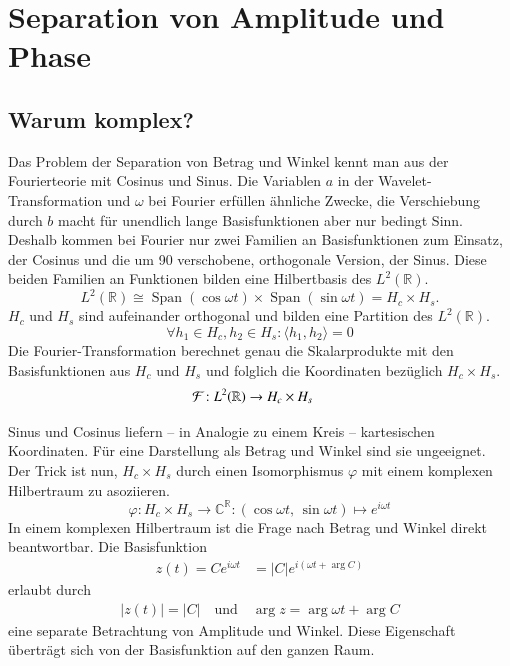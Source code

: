 \section{Separation von Amplitude und Phase}
\label{complex:separate}
\subsection{Warum komplex?}
Das Problem der Separation von Betrag und Winkel kennt man aus der Fourierteorie mit Cosinus und Sinus.
Die Variablen $a$ in der Wavelet-Transformation und $\omega$ bei Fourier erfüllen ähnliche Zwecke, die Verschiebung durch $b$ macht für unendlich lange Basisfunktionen aber nur bedingt Sinn.
Deshalb kommen bei Fourier nur zwei Familien an Basisfunktionen zum Einsatz, der Cosinus und die um 90\textdegree{} verschobene, orthogonale Version, der Sinus.
Diese beiden Familien an Funktionen bilden eine Hilbertbasis des $L^2(\mathbb{R})$. %
\[L^2(\mathbb{R}) \cong \mathop{\text{Span}}(\cos\omega t) \times \mathop{\text{Span}}(\sin\omega t) = H_c \times H_s.\]
$H_c$ und $H_s$ sind aufeinander orthogonal und bilden eine Partition des $L^2(\mathbb{R})$.
\[
\forall h_1 \in H_c, h_2 \in H_s: \langle h_1, h_2\rangle = 0
\]
Die Fourier-Transformation berechnet genau die Skalarprodukte mit den Basisfunktionen aus $H_c$ und $H_s$ und folglich die Koordinaten bezüglich $H_c\times H_s$.
\begin{align*}
	\Four : L^2(\mathbb{R}) &\to H_c \times H_s
\end{align*}

Sinus und Cosinus liefern -- in Analogie zu einem Kreis -- kartesischen Koordinaten. 
Für eine Darstellung als Betrag und Winkel sind sie ungeeignet.
Der Trick ist nun, $H_c \times H_s$ durch einen Isomorphismus $\varphi$ mit einem komplexen Hilbertraum zu asoziieren.
\[
	\varphi\colon H_c \times H_s \to \mathbb{C}^\mathbb{R} \colon
	(\cos\omega t,\, \sin\omega t) \mapsto e^{i\omega t}
\]
In einem komplexen Hilbertraum ist die Frage nach Betrag und Winkel direkt beantwortbar.
Die Basisfunktion
\begin{align*}
	z(t) = Ce^{i\omega t} &= |C|e^{i\left(\omega t + \arg C\right)}
\end{align*}
erlaubt durch 
\begin{align*}
	|z(t)| = |C| \quad \text{und}\quad
	\arg z = \arg \omega t + \arg C
\end{align*}
eine separate Betrachtung von Amplitude und Winkel.
Diese Eigenschaft überträgt sich von der Basisfunktion auf den ganzen Raum.


